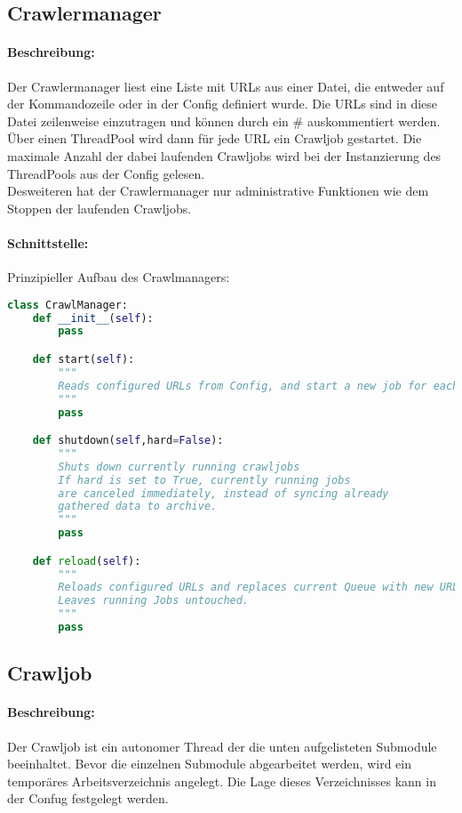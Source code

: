 \subsection{Crawlermanager}
\label{sub:crawlermanager}
\paragraph{Beschreibung:}
\label{par:beschreibung_}
Der Crawlermanager liest eine Liste mit URLs aus einer Datei, die entweder auf der Kommandozeile oder in
der Config definiert wurde. Die URLs sind in diese Datei zeilenweise einzutragen und können durch ein \# auskommentiert werden.
Über einen ThreadPool wird dann für jede URL ein Crawljob gestartet. Die maximale Anzahl der dabei laufenden Crawljobs wird bei
der Instanzierung des ThreadPools aus der Config gelesen.
\\
Desweiteren hat der Crawlermanager nur administrative Funktionen wie dem Stoppen der laufenden Crawljobs.
\paragraph{Schnittstelle:}
\label{par:schnittstelle_}
Prinzipieller Aufbau des Crawlmanagers:
\begin{lstlisting}[language=python]
class CrawlManager:
    def __init__(self):
        pass

    def start(self):
        """
        Reads configured URLs from Config, and start a new job for each
        """
        pass

    def shutdown(self,hard=False): 
        """
        Shuts down currently running crawljobs
        If hard is set to True, currently running jobs
        are canceled immediately, instead of syncing already
        gathered data to archive.
        """
        pass

    def reload(self):
        """
        Reloads configured URLs and replaces current Queue with new URLs.
        Leaves running Jobs untouched.
        """
        pass

\end{lstlisting}


\subsection{Crawljob}
\label{sub:crawljob}
\paragraph{Beschreibung:}
\label{par:beschreibung_}
Der Crawljob ist ein autonomer Thread der die unten aufgelisteten Submodule beeinhaltet.
Bevor die einzelnen Submodule abgearbeitet werden, wird ein temporäres Arbeitsverzeichnis angelegt.
Die Lage dieses Verzeichnisses kann in der Confug festgelegt werden.
